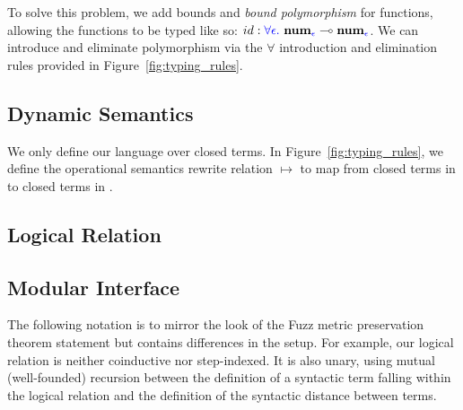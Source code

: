 To solve this problem, we add bounds and \textit{bound polymorphism} for
functions, allowing the functions to be typed like so: $id : \textcolor{blue}{\forall
\epsilon.} ~ \textbf{num}_{\textcolor{blue}{\epsilon}} \multimap
\textbf{num}_{\textcolor{blue}{\epsilon}}$. We can introduce and eliminate polymorphism via
the $\forall$ introduction and elimination rules provided in
Figure~\ref{fig:typing_rules}.



\subsection{Dynamic Semantics}
We only define our language over closed terms. In Figure~\ref{fig:typing_rules},
we define the operational semantics rewrite relation $\mapsto$ to map from
closed terms in \Lang to closed terms in \Lang.



\subsection{Logical Relation}


\subsection{Modular Interface}
The following notation is to mirror the look of the Fuzz metric preservation
theorem statement but contains differences in the setup. For example, our
logical relation is neither coinductive nor step-indexed. It is also unary,
using mutual (well-founded) recursion between the definition of a syntactic term
falling within the logical relation and the definition of the syntactic distance
between terms.

